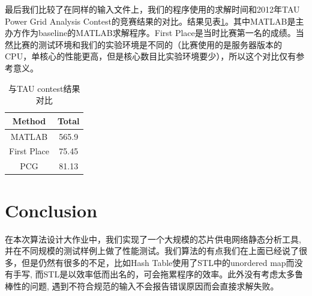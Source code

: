 \documentclass[UTF8,11pt]{report}
\begin{document}
最后我们比较了在同样的输入文件上，我们的程序使用的求解时间和2012年TAU Power Grid Analysis Contest\cite{6105371}的竞赛结果的对比。结果见表\ref{tab:tau}。其中MATLAB是主办方作为baseline的MATLAB求解程序。First Place是当时比赛第一名的成绩。当然比赛的测试环境和我们的实验环境是不同的（比赛使用的是服务器版本的CPU，单核心的性能更高，但是核心数目比实验环境要少），所以这个对比仅有参考意义。

\begin{table}
	\centering
	\caption{与TAU contest结果对比}
	\label{tab:tau}
	\begin{tabular}{c|c}
	\toprule
	Method & Total\\
	\midrule
	MATLAB & 565.9\\
	First Place & 75.45\\
	\midrule
	PCG & 81.13\\
	\bottomrule
	\end{tabular}
\end{table}


\section{Conclusion}
在本次算法设计大作业中，我们实现了一个大规模的芯片供电网络静态分析工具, 并在不同规模的测试样例上做了性能测试。我们算法的有点我们在上面已经说了很多，但是仍然有很多的不足，比如Hash Table使用了STL中的unordered map而没有手写, 而STL是以效率低而出名的，可会拖累程序的效率。此外没有考虑太多鲁棒性的问题, 遇到不符合规范的输入不会报告错误原因而会直接求解失败。



\end{document}
